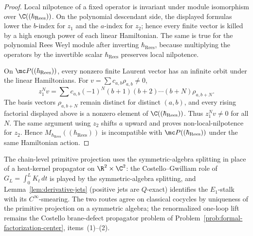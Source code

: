\begin{proof}
  Local nilpotence of a fixed operator is invariant under module
  isomorphism over \(\C((\hbar_{\mathrm{Rees}}))\).  On the polynomial descendant side,
  the displayed formulas lower the \(b\)-index for \(z_1\) and the
  \(a\)-index for \(z_2\); hence every finite vector is killed by a high
  enough power of each linear Hamiltonian.  The same is true for the
	  polynomial Rees Weyl module after inverting \(\hbar_{\mathrm{Rees}}\), because
	  multiplying the operators by the invertible scalar \(\hbar_{\mathrm{Rees}}\) preserves
	  local nilpotence.

	  On \(\mc P((\hbar_{\mathrm{Rees}}))\), every nonzero finite Laurent vector has an
	  infinite orbit under the linear Hamiltonians.  For
  \(v=\sum c_{a,b}\rho_{a,b}\neq0\),
  \[
    z_1^N v
      =
      \sum c_{a,b}(-1)^N(b+1)(b+2)\cdots(b+N)\rho_{a,b+N}.
  \]
  The basis vectors \(\rho_{a,b+N}\) remain distinct for distinct
  \((a,b)\), and every rising factorial displayed above is a nonzero
  element of \(\C((\hbar_{\mathrm{Rees}}))\).  Thus \(z_1^Nv\neq0\) for all \(N\).  The
  same argument using \(z_2\) shifts \(a\) upward and proves
  non-local-nilpotence for \(z_2\).  Hence
  \(M_{\hbar_{\mathrm{Rees}}}((\hbar_{\mathrm{Rees}}))\) is incompatible with
  \(\mc P((\hbar_{\mathrm{Rees}}))\) under the same Hamiltonian action.
\end{proof}

\begin{rmk}\label{rmk:chain-level-primitive-algebraic-input}
  The chain-level primitive projection uses the symmetric-algebra splitting
  in place of a heat-kernel propagator on $\R^2\times\C^2$: the
  Costello--Gwilliam role of
  $G_L=\int_0^L K_t\,dt$ is played by the symmetric-algebra splitting,
  and Lemma~\ref{lem:derivative-jets} (positive jets are $Q$-exact)
  identifies the $E_1$-stalk with its $C^\infty$-smearing.  The two
  routes agree on classical cocycles by uniqueness of the primitive
  projection on a symmetric algebra; the renormalized one-loop lift
  remains the Costello brane-defect propagator problem of
  Problem~\ref{prob:formal-factorization-center}, items~(1)--(2).
\end{rmk}

